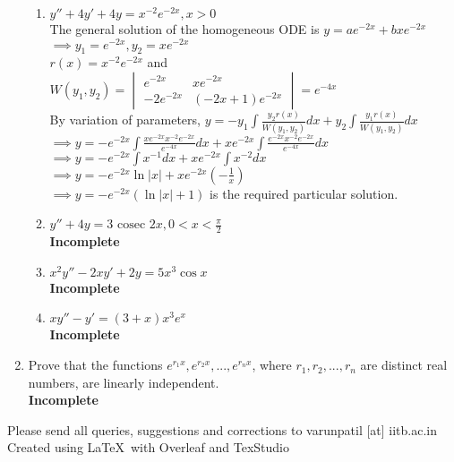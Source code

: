\documentclass[a4paper]{article}
\begin{document}
\begin{enumerate}
\begin{enumerate}
	\item $y''+4y'+4y=x^{-2}e^{-2x}, x>0$\\
	The general solution of the homogeneous ODE is $y=ae^{-2x}+bxe^{-2x}$\\
	$\implies y_1=e^{-2x}, y_2=xe^{-2x}$\\
	$r(x)=x^{-2}e^{-2x}$ and $W(y_1,y_2)=\begin{vmatrix}
	e^{-2x}  & xe^{-2x}\\
	-2e^{-2x} & (-2x+1)e^{-2x}
	\end{vmatrix} = e^{-4x}$\\
	By variation of parameters, $y=-y_1\int \frac{y_2 r(x)}{W(y_1,y_2)} dx + y_2\int \frac{y_1 r(x)}{W(y_1,y_2)}dx$\\
	$\implies y=-e^{-2x}\int \frac{xe^{-2x} x^{-2}e^{-2x}}{e^{-4x}} dx + xe^{-2x}\int \frac{e^{-2x} x^{-2}e^{-2x}}{e^{-4x}}dx$\\
	$\implies y=-e^{-2x}\int x^{-1} dx + xe^{-2x}\int x^{-2}dx$\\
	$\implies y=-e^{-2x}\ln |x| + xe^{-2x}(-\frac{1}{x})$\\
	$\implies y=-e^{-2x}(\ln |x| + 1 )$ is the required particular solution.
	
	\item $y''+4y=3\text{ cosec }2x, 0<x<\frac{\pi}{2}$ \\ \textbf{Incomplete}
	\item $x^2y''-2xy'+2y=5x^3\cos x$ \\ \textbf{Incomplete}
	\item $xy''-y'=(3+x)x^3e^x$ \\ \textbf{Incomplete}
\end{enumerate}

\item Prove that the functions $e^{r_1x},e^{r_2x},...,e^{r_nx}$, where $r_1, r_2,...,r_n$ are distinct real numbers, are linearly independent.
\\ \textbf{Incomplete}

\end{enumerate}

\begin{center}
Please send all queries, suggestions and corrections to varunpatil [at] iitb.ac.in
\\Created using \LaTeX \ with Overleaf and TexStudio
\end{center}
\end{document}
